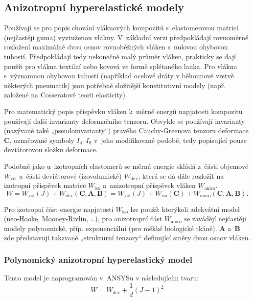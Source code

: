
\subsection{Anizotropní hyperelastické modely}\label{sec:anizotropni-hyperelasticke-modely}
Používají se pro popis chování vláknových kompozitů s~elastomerovou matricí (nejčastěji guma) vyztuženou vlákny.
V~základní verzi předpokládají rovnoměrné rozložení maximálně dvou osnov rovnoběžných vláken s~nulovou ohybovou tuhostí.
Předpokládají tedy nekonečně malý průměr vláken, prakticky se dají použít pro vlákna textilní nebo kovová ve formě splétaného lanka.
Pro vlákna s~významnou ohybovou tuhostí (například ocelové dráty v běhounové vrstvě některých pneumatik) jsou potřebné složitější konstitutivní modely (např. založené na Cosseratově teorii elasticity).

Pro matematický popis příspěvku vláken k~měrné energii napjatosti kompozitu používají další invarianty deformačního tenzoru. Obvykle se používají invarianty (nazývané také „pseudoinvarianty“) pravého Cauchy-Greenova tenzoru deformace $\bm{C}$, označované symboly $I_4$--$I_9$ v~jeho modifikované podobě, tedy popisující pouze deviátorovou složku deformace.

Podobně jako u~izotropních elastomerů se měrná energie skládá z~části objemové $W_\text{vol}$ a~části deviátorové (izovolumické) $W_\text{dev}$, která se dá dále rozložit na izotropní příspěvek matrice $W_\text{iso}$ a~anizotropní příspěvek vláken $W_\text{aniso}$.
\begin{equation}
	W = W_\text{vol}(J) + W_\text{dev}(\bm{C},\bm{A},\bm{B}) = W_\text{vol}(J) + W_\text{iso}(\bm{C}) + W_\text{aniso}(\bm{C},\bm{A},\bm{B}).
\end{equation}

Pro izotropní část energie napjatosti $W_\text{iso}$ lze použít kterýkoli adekvátní model (\hyperref[sec:neo-hooke]{neo-Hooke}, \hyperref[sec:mooney-rivlin]{Mooney-Rivlin}, \ldots), pro anizotropní část $W_\text{aniso}$ se zavádějí nejčastěji modely polynomické, příp. exponenciální (pro měkké biologické tkáně). $\bm{A}$ a~$\bm{B}$ zde představují takzvané „strukturní tenzory“ definující směry dvou osnov vláken.

\subsubsection{Polynomický anizotropní hyperelastický model}\label{sec:polynomicky-anizotropni-hyperelasticky-model}
Tento model je naprogramován v~ANSYSu v následujícím tvaru:
\begin{equation}
	W = W_\text{dev} + \frac{1}{d} \left(J-1\right)^2
\end{equation}

